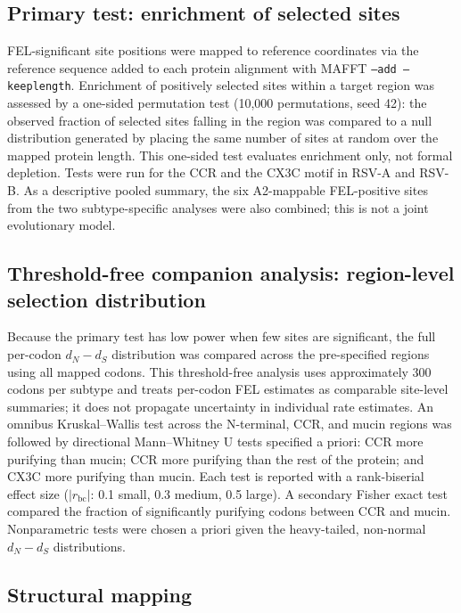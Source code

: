 \documentclass[11pt]{article}
\newcommand{\dndsdiff}{\ensuremath{d_N-d_S}}
\newcommand{\rbc}{\ensuremath{r_{\mathrm{bc}}}}
\begin{document}
\subsection{Primary test: enrichment of selected sites}

FEL-significant site positions were mapped to reference coordinates via the reference sequence added to each protein alignment with MAFFT \texttt{--add --keeplength}. Enrichment of positively selected sites within a target region was assessed by a one-sided permutation test (10,000 permutations, seed 42): the observed fraction of selected sites falling in the region was compared to a null distribution generated by placing the same number of sites at random over the mapped protein length. This one-sided test evaluates enrichment only, not formal depletion. Tests were run for the CCR and the CX3C motif in RSV-A and RSV-B. As a descriptive pooled summary, the six A2-mappable FEL-positive sites from the two subtype-specific analyses were also combined; this is not a joint evolutionary model.

\subsection{Threshold-free companion analysis: region-level selection distribution}

Because the primary test has low power when few sites are significant, the full per-codon \dndsdiff{} distribution was compared across the pre-specified regions using all mapped codons. This threshold-free analysis uses approximately 300 codons per subtype and treats per-codon FEL estimates as comparable site-level summaries; it does not propagate uncertainty in individual rate estimates. An omnibus Kruskal--Wallis test across the N-terminal, CCR, and mucin regions was followed by directional Mann--Whitney U tests specified a priori: CCR more purifying than mucin; CCR more purifying than the rest of the protein; and CX3C more purifying than mucin. Each test is reported with a rank-biserial effect size ($|\rbc|$: 0.1 small, 0.3 medium, 0.5 large). A secondary Fisher exact test compared the fraction of significantly purifying codons between CCR and mucin. Nonparametric tests were chosen a priori given the heavy-tailed, non-normal \dndsdiff{} distributions.

\subsection{Structural mapping}
\end{document}
